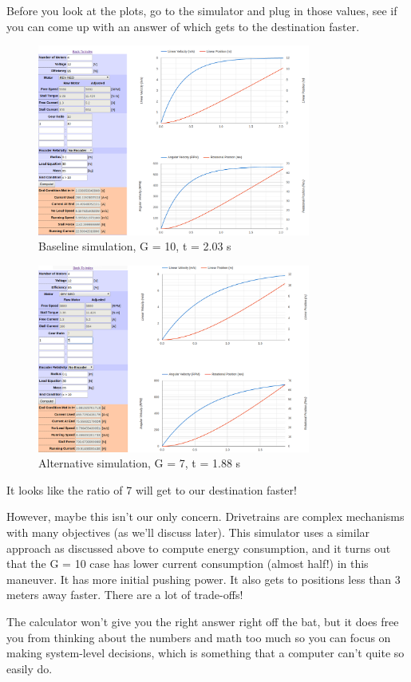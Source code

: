 Before you look at the plots, go to the simulator and plug in those values, see if you can come up with an answer of which gets to the destination faster.

\clearpage
	
	\begin{figure}[H] \centering
	\includegraphics[width=0.8\textwidth]{imgs/thsae_1.png}
	\caption{Baseline simulation, G = 10, t = 2.03 s}
	\end{figure}
	
	\begin{figure}[H] \centering
	\includegraphics[width=0.8\textwidth]{imgs/thsae_2.png}
	\caption{Alternative simulation, G = 7, t = 1.88 s}
	\end{figure}
	
	It looks like the ratio of 7 will get to our destination faster!
	
	However, maybe this isn't our only concern. Drivetrains are complex mechanisms with many objectives (as we'll discuss later). This simulator uses a similar approach as discussed above to compute energy consumption, and it turns out that the G = 10 case has lower current consumption (almost half!) in this maneuver. It has more initial pushing power. It also gets to positions less than 3 meters away faster. There are a lot of trade-offs!
	
	The calculator won't give you the right answer right off the bat, but it does free you from thinking about the numbers and math too much so you can focus on making system-level decisions, which is something that a computer can't quite so easily do.
	
